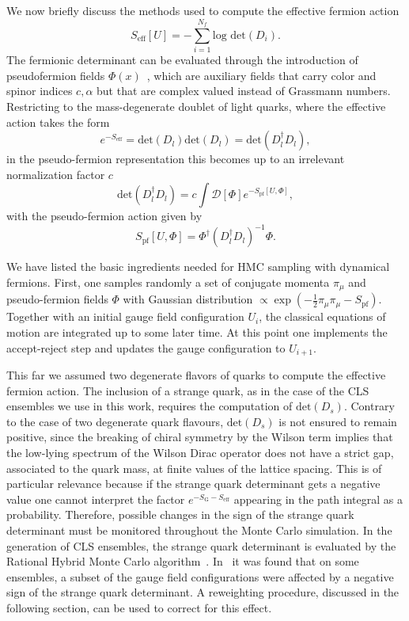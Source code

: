 We now briefly discuss the methods used to compute the effective fermion action
\begin{equation}
S_{\textrm{eff}}[U]=-\sum_{i=1}^{N_f}\textrm{log det}(D_i).
\end{equation}
The fermionic determinant can be evaluated through the introduction of pseudofermion fields $\Phi(x)$~\citep{Weingarten:1980hx}, which are auxiliary fields that carry color and spinor indices $c,\alpha$ but that are complex valued instead of Grassmann numbers. Restricting to the mass-degenerate doublet of light quarks, where the effective action takes the form
\begin{equation}
e^{-S_{\textrm{eff}}}=\textrm{det}(D_l)\textrm{det}(D_l)=\textrm{det}(D_l^{\dagger}D_l),
\end{equation}
in the pseudo-fermion representation this becomes up to an irrelevant normalization factor $c$
\begin{equation}
\textrm{det}(D_l^{\dagger}D_l)=c\int\mathcal{D}[\Phi]e^{-S_{\textrm{pf}}[U,\Phi]},
\end{equation}
with the pseudo-fermion action given by
\begin{equation}
S_{\textrm{pf}}[U,\Phi]=\Phi^{\dagger}\left(D_l^{\dagger}D_l\right)^{-1}\Phi.
\end{equation}

We have listed the basic ingredients needed for HMC sampling with dynamical fermions. First, one samples randomly a set of conjugate momenta $\pi_{\mu}$ and pseudo-fermion fields $\Phi$ with Gaussian distribution $\propto\exp\left(-\frac{1}{2}\pi_{\mu}\pi_{\mu}-S_{\textrm{pf}}\right)$. Together with an initial gauge field configuration $U_{i}$, the classical equations of motion are integrated up to some later time. At this point one implements the accept-reject step and updates the gauge configuration to $U_{i+1}$.

This far we assumed two degenerate flavors of quarks to compute the effective fermion action. The inclusion of a strange quark, as in
the case of the CLS ensembles we use in this work,  requires the computation of $\textrm{det}(D_s)$. Contrary to the case of two degenerate quark flavours, $\textrm{det}(D_s)$ is not ensured to remain positive, since the breaking of chiral symmetry by the Wilson term implies that the low-lying spectrum of the Wilson Dirac operator does not have a strict gap, associated to the quark mass, at finite values of the lattice spacing. This is of particular relevance because if the strange quark determinant gets a negative value one cannot interpret the factor $e^{-S_{\textrm{G}}-S_{\textrm{eff}}}$ appearing in the path integral as a probability. Therefore, possible changes in the sign of the strange quark determinant must be monitored throughout the Monte Carlo simulation. In the generation of CLS ensembles, the strange quark determinant is evaluated by the Rational Hybrid Monte Carlo algorithm~\citep{Kennedy:1998cu,Clark:2006fx}. In~\citep{Mohler:2020txx} it was found that on some ensembles, a subset of the gauge field configurations  were affected by a negative sign of the strange quark determinant. A reweighting procedure, discussed in the following section, can be used to correct for this effect.

